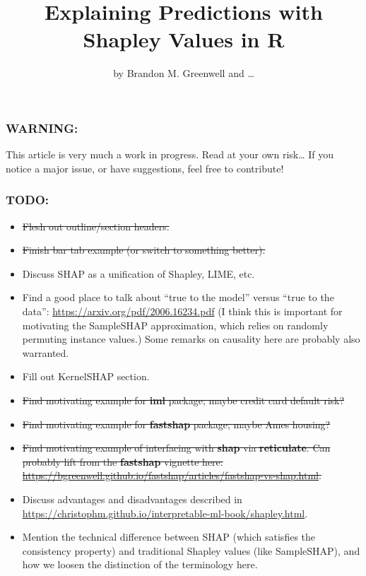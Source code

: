 \title{Explaining Predictions with Shapley Values in R}
\author{by Brandon M. Greenwell and \ldots{}}

\maketitle


\hypertarget{warning}{%
\subsubsection{WARNING:}\label{warning}}

This article is very much a work in progress. Read at your own
risk\ldots{} If you notice a major issue, or have suggestions, feel free
to contribute!

\hypertarget{todo}{%
\subsubsection{TODO:}\label{todo}}

\begin{itemize}
\tightlist
\item
  \sout{Flesh out outline/section headers.}
\item
  \sout{Finish bar tab example (or switch to something better).}
\item
  Discuss SHAP as a unification of Shapley, LIME, etc.
\item
  Find a good place to talk about ``true to the model'' versus ``true to
  the data'': \url{https://arxiv.org/pdf/2006.16234.pdf} (I think this
  is important for motivating the SampleSHAP approximation, which relies
  on randomly permuting instance values.) Some remarks on causality here
  are probably also warranted.
\item
  Fill out KernelSHAP section.
\item
  \sout{Find motivating example for \textbf{iml} package; maybe credit
  card default risk?}
\item
  \sout{Find motivating example for \textbf{fastshap} package; maybe
  Ames housing?}
\item
  \sout{Find motivating example of interfacing with \textbf{shap} via
  \textbf{reticulate}. Can probably lift from the \textbf{fastshap}
  vignette here:
  \url{https://bgreenwell.github.io/fastshap/articles/fastshap-vs-shap.html}.}
\item
  Discuss advantages and disadvantages described in
  \url{https://christophm.github.io/interpretable-ml-book/shapley.html}.
\item
  Mention the technical difference between SHAP (which satisfies the
  consistency property) and traditional Shapley values (like
  SampleSHAP), and how we loosen the distinction of the terminology
  here.
\end{itemize}

